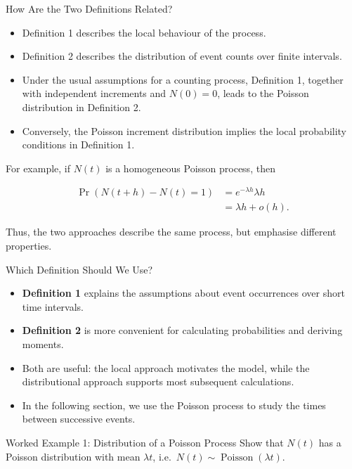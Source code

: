 \documentclass[
  ignorenonframetext,
  aspectratio=169,
]{beamer}
\providecommand{\tightlist}{%
  \setlength{\itemsep}{0pt}\setlength{\parskip}{0pt}}
\begin{document}
\begin{frame}{How Are the Two Definitions Related?}
\protect{}\label{how-are-the-two-definitions-related}
\begin{itemize}
\tightlist
\item
  Definition 1 describes the local behaviour of the process.
\item
  Definition 2 describes the distribution of event counts over finite
  intervals.
\item
  Under the usual assumptions for a counting process, Definition 1,
  together with independent increments and \(N(0)=0\), leads to the
  Poisson distribution in Definition 2.
\item
  Conversely, the Poisson increment distribution implies the local
  probability conditions in Definition 1.
\end{itemize}

For example, if \(N(t)\) is a homogeneous Poisson process, then

\[
\begin{aligned}
\Pr(N(t+h)-N(t)=1)
&=e^{-\lambda h}\lambda h\\
&=\lambda h+o(h).
\end{aligned}
\]

Thus, the two approaches describe the same process, but emphasise
different properties.
\end{frame}

\begin{frame}{Which Definition Should We Use?}
\protect{}\label{which-definition-should-we-use}
\begin{itemize}
\tightlist
\item
  \textbf{Definition 1} explains the assumptions about event occurrences
  over short time intervals.
\item
  \textbf{Definition 2} is more convenient for calculating probabilities
  and deriving moments.
\item
  Both are useful: the local approach motivates the model, while the
  distributional approach supports most subsequent calculations.
\item
  In the following section, we use the Poisson process to study the
  times between successive events.
\end{itemize}
\end{frame}

\begin{frame}{Worked Example 1: Distribution of a Poisson Process}
\protect{}\label{worked-example-1-distribution-of-a-poisson-process}
Show that \(N(t)\) has a Poisson distribution with mean \(\lambda t\),
i.e.~\(N(t)\sim\operatorname{Poisson}(\lambda t)\).
\end{frame}
\end{document}
